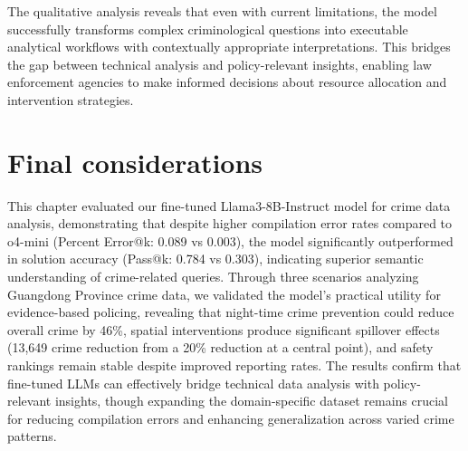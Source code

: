 The qualitative analysis reveals that even with current limitations, the model successfully transforms complex criminological questions into executable analytical workflows with contextually appropriate interpretations. This bridges the gap between technical analysis and policy-relevant insights, enabling law enforcement agencies to make informed decisions about resource allocation and intervention strategies.



\section{Final considerations}

This chapter evaluated our fine-tuned Llama3-8B-Instruct model for crime data analysis, demonstrating that despite higher compilation error rates compared to o4-mini (Percent Error@k: 0.089 vs 0.003), the model significantly outperformed in solution accuracy (Pass@k: 0.784 vs 0.303), indicating superior semantic understanding of crime-related queries. Through three scenarios analyzing Guangdong Province crime data, we validated the model's practical utility for evidence-based policing, revealing that night-time crime prevention could reduce overall crime by 46\%, spatial interventions produce significant spillover effects (13,649 crime reduction from a 20\% reduction at a central point), and safety rankings remain stable despite improved reporting rates. The results confirm that fine-tuned LLMs can effectively bridge technical data analysis with policy-relevant insights, though expanding the domain-specific dataset remains crucial for reducing compilation errors and enhancing generalization across varied crime patterns.

